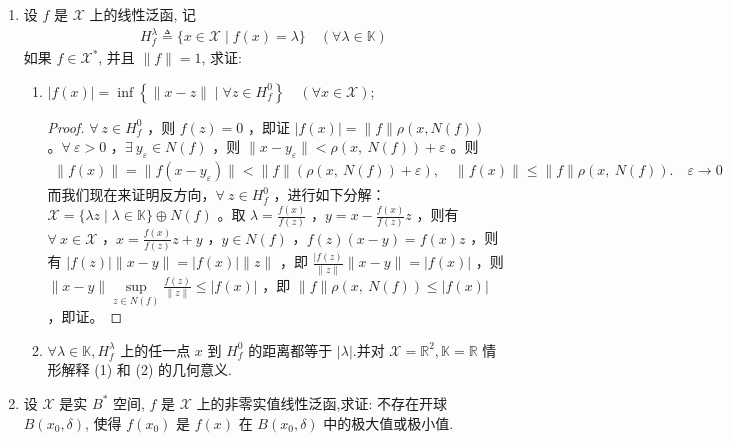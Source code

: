 \begin{enumerate}[leftmargin=2cm, label=\arabic*]
\begin{enumerate}[leftmargin=1cm, label=(\arabic*)]
\begin{align*}
				f \in \mathscr{X}^{*} \Longleftrightarrow N(f) \text { 是闭线性子空间. }
			\end{align*}
			\begin{proof}
				必要性由 (1) 已经证明，我们来证明充分性。利用反证法，若 $\forall\ x_n$ ，$\|x_n\| = 1$ ，$|f(x_n)| \geqslant n$ ，$y_n = \frac{x_n}{f(x_n)} - \frac{x_1}{f(x_1)}$ ，则有 $y_n = 0$ 进而推出 $y_n\in N(f)$ ，但是 $y_n\to -\frac{x_1}{f(x_1} \notin N(f)$ 与闭空间矛盾。
			\end{proof}
		\end{enumerate}
		\item 设 $f$ 是 $\mathscr{X}$ 上的线性泛函, 记
		\begin{align*}
			H_{f}^{\lambda} \triangleq\{x \in \mathscr{X} \mid f(x)=\lambda\} \quad(\forall \lambda \in \mathbb{K})
		\end{align*}
		如果 $f \in \mathscr{X}^{*}$, 并且 $\|f\|=1$, 求证:
		\begin{enumerate}[leftmargin=1cm, label=(\arabic*)]
			\item $|f(x)|=\inf \left\{\|x-z\| \mid \forall z \in H_{f}^{0}\right\} \quad(\forall x \in \mathscr{X})$;
			\begin{proof}
				$\forall\ z\in H_f^0$ ，则 $f(z) = 0$ ，即证 $|f(x)| = \|f\|\rho(x, N(f))$ 。$\forall\ \varepsilon>0$ ，$\exists\ y_{\varepsilon}\in N(f)$ ，则 $\|x-y_{\varepsilon}\| < \rho(x,\ N(f)) + \varepsilon$ 。则
				\begin{align*}
					\|f(x)\| = \|f(x-y_{\varepsilon})\| < \|f\|\left(\rho(x,\ N(f)) + \varepsilon \right), \quad \|f(x)\| \leqslant \|f\| \rho(x,\ N(f)).\quad \varepsilon \to 0
				\end{align*}
				而我们现在来证明反方向，$\forall\ z\in H_f^0$ ，进行如下分解：$\mathscr{X} = \{\lambda z\mid \lambda\in \mathbb{K}\} \oplus N(f)$ 。取 $\lambda = \frac{f(x)}{f(z)}$ ，$y = x - \frac{f(x)}{f(z)}z$ ，则有 $\forall\ x\in \mathscr{X}$ ，$x = \frac{f(x)}{f(z)} z + y$ ，$y\in N(f)$ ，$f(z)(x-y) = f(x)z$ ，则有 $|f(z)|\|x-y\| = |f(x)|\|z\|$ ，即 $\frac{|f(z)}{\|z\|} \|x-y\| = |f(x)|$ ，则 $\|x-y\| \sup\limits_{z\in N(f)} \frac{f(z)}{\|z\|} \leqslant |f(x)|$ ，即 $\|f\|\rho(x,\ N(f)) \leqslant |f(x)|$ ，即证。
			\end{proof}
			\item $\forall \lambda \in \mathbb{K}, H_{f}^{\lambda}$ 上的任一点 $x$ 到 $H_{f}^{0}$ 的距离都等于 $|\lambda|$.并对 $\mathscr{X}=\mathbb{R}^{2}, \mathbb{K}=\mathbb{R}$ 情形解释 (1) 和 (2) 的几何意义.
		\end{enumerate}
		\item 设 $\mathscr{X}$ 是实 $B^{*}$ 空间, $f$ 是 $\mathscr{X}$ 上的非零实值线性泛函,求证: 不存在开球 $B\left(x_{0}, \delta\right)$, 使得 $f\left(x_{0}\right)$ 是 $f(x)$ 在 $B\left(x_{0}, \delta\right)$ 中的极大值或极小值.

\end{enumerate}
